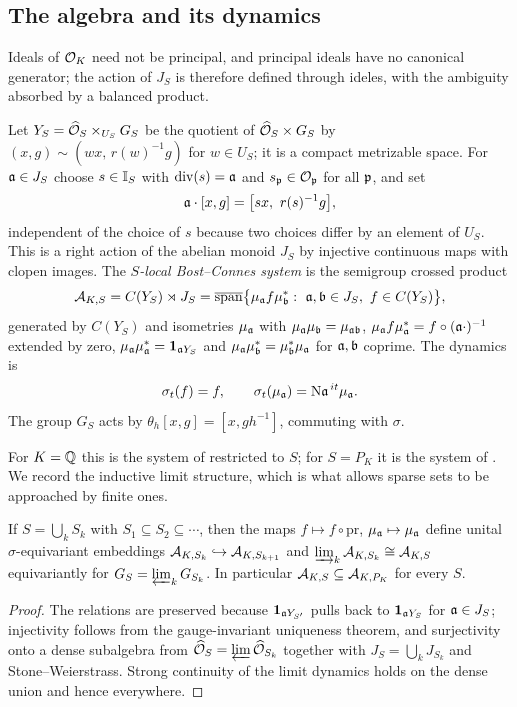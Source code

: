 \subsection{The algebra and its dynamics}

Ideals of $\mathcal{O}_K$ need not be principal, and principal ideals have no canonical
generator; the action of $J_S$ is therefore defined through ideles, with the
ambiguity absorbed by a balanced product.

\begin{definition}\label{Main:def:system}
Let $Y_S=\widehat{\mathcal{O}}_S\times_{U_S}G_S$ be the quotient of $\widehat{\mathcal{O}}_S\times G_S$ by
$(x,g)\sim(wx,\,r(w)^{-1}g)$ for $w\in U_S$; it is a compact metrizable space.
For $\mathfrak{a}\in J_S$ choose $s\in\mathbb{I}_S$ with $\operatorname{div}(s)=\mathfrak{a}$ and
$s_{\mathfrak{p}}\in\mathcal{O}_{\mathfrak{p}}$ for all $\mathfrak{p}$, and set
\[
\aaa\cdot[x,g]=\bigl[sx,\ r(s)^{-1}g\bigr],
\]
independent of the choice of $s$ because two choices differ by an element of
$U_S$. This is a right action of the abelian monoid $J_S$ by injective
continuous maps with clopen images. The \emph{$S$-local Bost--Connes system} is
the semigroup crossed product
\[
\mathcal{A}_{K,S}=C(Y_S)\rtimes J_S=\overline{\operatorname{span}}\bigl\{\mu_{\mathfrak{a}} f\mu_{\mathfrak{b}}^*:\ \mathfrak{a},\mathfrak{b}\in J_S,\ f\in C(Y_S)\bigr\},
\]
generated by $C(Y_S)$ and isometries $\mu_{\mathfrak{a}}$ with
$\mu_{\mathfrak{a}}\mu_{\mathfrak{b}}=\mu_{\mathfrak{a}\mathfrak{b}}$, $\mu_{\mathfrak{a}} f\mu_{\mathfrak{a}}^*=f\circ(\mathfrak{a}\cdot)^{-1}$
extended by zero, $\mu_{\mathfrak{a}}\mu_{\mathfrak{a}}^*=\mathbf 1_{\mathfrak{a} Y_S}$ and
$\mu_{\mathfrak{a}}\mu_{\mathfrak{b}}^*=\mu_{\mathfrak{b}}^*\mu_{\mathfrak{a}}$ for $\mathfrak{a},\mathfrak{b}$ coprime. The dynamics is
\[
\sigma_t(f)=f,\qquad\sigma_t(\mu_{\mathfrak{a}})=\mathrm{N}\mathfrak{a}^{\,it}\mu_{\mathfrak{a}} .
\]
The group $G_S$ acts by $\theta_h[x,g]=[x,gh^{-1}]$, commuting with $\sigma$.
\end{definition}

For $K=\mathbb{Q}$ this is the system of \cite{LR} restricted to $S$; for $S=P_K$ it is
the system of \cite{HP,LLN}. We record the inductive limit structure, which is
what allows sparse sets to be approached by finite ones.

\begin{proposition}\label{Main:prop:indlim}
If $S=\bigcup_kS_k$ with $S_1\subseteq S_2\subseteq\cdots$, then the maps
$f\mapsto f\circ\mathrm{pr}$, $\mu_{\mathfrak{a}}\mapsto\mu_{\mathfrak{a}}$ define unital
$\sigma$-equivariant embeddings $\mathcal{A}_{K,S_k}\hookrightarrow\mathcal{A}_{K,S_{k+1}}$ and
$\varinjlim_k\mathcal{A}_{K,S_k}\cong\mathcal{A}_{K,S}$ equivariantly for
$G_S=\varprojlim_kG_{S_k}$. In particular $\mathcal{A}_{K,S}\subseteq\mathcal{A}_{K,P_K}$ for
every $S$.
\end{proposition}

\begin{proof}
The relations are preserved because $\mathbf 1_{\mathfrak{a} Y_{S'}}$ pulls back to
$\mathbf 1_{\mathfrak{a} Y_S}$ for $\mathfrak{a}\in J_S$; injectivity follows from the
gauge-invariant uniqueness theorem, and surjectivity onto a dense subalgebra
from $\widehat{\mathcal{O}}_S=\varprojlim\widehat{\mathcal{O}}_{S_k}$ together with
$J_S=\bigcup_kJ_{S_k}$ and Stone--Weierstrass. Strong continuity of the limit
dynamics holds on the dense union and hence everywhere.
\end{proof}

